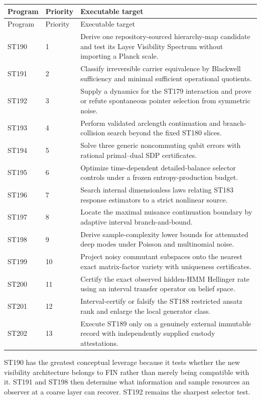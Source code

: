 \documentclass[11pt,a4paper]{article}
\begin{document}
\begin{longtable}{@{}p{}p{}p{}@{}}
\toprule Program & Priority & Executable target\\\midrule\endfirsthead
\toprule Program & Priority & Executable target\\\midrule\endhead
ST190 & 1 & Derive one repository-sourced hierarchy-map candidate and test its Layer Visibility Spectrum without importing a Planck scale.\\
ST191 & 2 & Classify irreversible carrier equivalence by Blackwell sufficiency and minimal sufficient operational quotients.\\
ST192 & 3 & Supply a dynamics for the ST179 interaction and prove or refute spontaneous pointer selection from symmetric noise.\\
ST193 & 4 & Perform validated arclength continuation and branch-collision search beyond the fixed ST180 slices.\\
ST194 & 5 & Solve three generic noncommuting qubit errors with rational primal--dual SDP certificates.\\
ST195 & 6 & Optimize time-dependent detailed-balance selector controls under a frozen entropy-production budget.\\
ST196 & 7 & Search internal dimensionless laws relating ST183 response estimators to a strict nonlinear source.\\
ST197 & 8 & Locate the maximal nuisance continuation boundary by adaptive interval branch-and-bound.\\
ST198 & 9 & Derive sample-complexity lower bounds for attenuated deep modes under Poisson and multinomial noise.\\
ST199 & 10 & Project noisy commutant subspaces onto the nearest exact matrix-factor variety with uniqueness certificates.\\
ST200 & 11 & Certify the exact observed hidden-HMM Hellinger rate using an interval transfer operator on belief space.\\
ST201 & 12 & Interval-certify or falsify the ST188 restricted ansatz rank and enlarge the local generator class.\\
ST202 & 13 & Execute ST189 only on a genuinely external immutable record with independently supplied custody attestations.\\
\bottomrule
\end{longtable}

ST190 has the greatest conceptual leverage because it tests whether the new visibility architecture belongs to FIN rather than merely being compatible with it. ST191 and ST198 then determine what information and sample resources an observer at a coarse layer can recover. ST192 remains the sharpest selector test.
\end{document}
